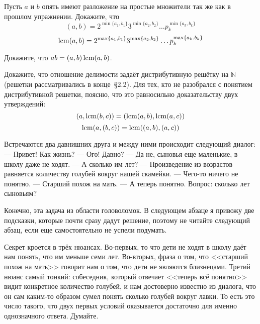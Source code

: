 \begin{exercise}
Пусть $a$ и $b$ опять имеют разложение на простые множители так же как в прошлом упражнении. Докажите, что
$$(a, b) = 2^{\min\{a_1, b_1\}} 3^{\min\{a_2, b_2\}}\ldots p_k^{\min\{a_k, b_k\}}$$
$$\operatorname{lcm}(a, b) = 2^{\max\{a_1, b_1\}} 3^{\max\{a_2, b_2\}}\ldots p_k^{\max\{a_k, b_k\}}$$
\end{exercise}

\begin{exercise}
Докажите, что $ab = (a, b) \operatorname{lcm}(a, b)$.
\end{exercise}

\begin{exercise}
Докажите, что отношение делимости задаёт дистрибутивную решётку на $\mathbb{N}$ (решетки рассматривались в конце~\S2.2). Для тех, кто не разобрался с понятием дистрибутивной решетки, поясню, что это равносильно доказательству двух утверждений:
$$(a, \operatorname{lcm}(b, c)) = (\operatorname{lcm}(a, b), \operatorname{lcm}(a, c))$$
$$\operatorname{lcm}(a, (b, c)) = \operatorname{lcm}((a, b), (a, c))$$
\end{exercise}

\begin{exercise}
Встречаются два давнишних друга и между ними происходит следующий диалог:
--- Привет! Как жизнь?
--- Ого! Давно?
--- Да не, сыновья еще маленькие, в школу даже не ходят.
--- А сколько им лет?
--- Произведение из возрастов равняется количеству голубей вокруг нашей скамейки.
--- Чего-то ничего не понятно.
--- Старший похож на мать.
--- А теперь понятно.
Вопрос: сколько лет сыновьям?
\end{exercise}

Конечно, эта задача из области головоломок. В следующем абзаце я привожу две подсказки, которые почти сразу дадут решение, поэтому не читайте следующий абзац, если еще самостоятельно не успели подумать.

Секрет кроется в трёх нюансах. Во-первых, то что дети не ходят в школу даёт нам понять, что им меньше семи лет. Во-вторых, фраза о том, что <<старший похож на мать>> говорит нам о том, что дети не являются близнецами. Третий нюанс самый тонкий: собеседник, который отвечает <<теперь всё понятно>> видит конкретное количество голубей, и нам достоверно известно из диалога, что он сам каким-то образом сумел понять сколько голубей вокруг лавки. То есть это число такого, что двух первых условий оказывается достаточно для именно однозначного ответа. Думайте.